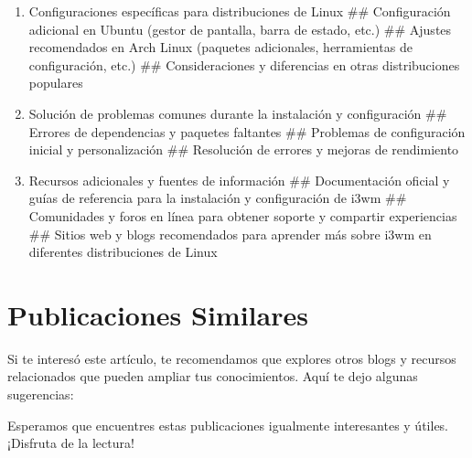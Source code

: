 \documentclass[
  jou,
  floatsintext,
  longtable,
  a4paper,
  nolmodern,
  notxfonts,
  notimes,
  12pt,
  colorlinks=true,linkcolor=blue,citecolor=blue,urlcolor=blue]{apa7}
\begin{document}
\begin{enumerate}
\def\labelenumi{\arabic{enumi}.}
\item
  Configuraciones específicas para distribuciones de Linux \#\#
  Configuración adicional en Ubuntu (gestor de pantalla, barra de
  estado, etc.) \#\# Ajustes recomendados en Arch Linux (paquetes
  adicionales, herramientas de configuración, etc.) \#\# Consideraciones
  y diferencias en otras distribuciones populares
\item
  Solución de problemas comunes durante la instalación y configuración
  \#\# Errores de dependencias y paquetes faltantes \#\# Problemas de
  configuración inicial y personalización \#\# Resolución de errores y
  mejoras de rendimiento
\item
  Recursos adicionales y fuentes de información \#\# Documentación
  oficial y guías de referencia para la instalación y configuración de
  i3wm \#\# Comunidades y foros en línea para obtener soporte y
  compartir experiencias \#\# Sitios web y blogs recomendados para
  aprender más sobre i3wm en diferentes distribuciones de Linux
\end{enumerate}

\section{Publicaciones Similares}\label{publicaciones-similares}

Si te interesó este artículo, te recomendamos que explores otros blogs y
recursos relacionados que pueden ampliar tus conocimientos. Aquí te dejo
algunas sugerencias:

Esperamos que encuentres estas publicaciones igualmente interesantes y
útiles. ¡Disfruta de la lectura!
\end{document}
